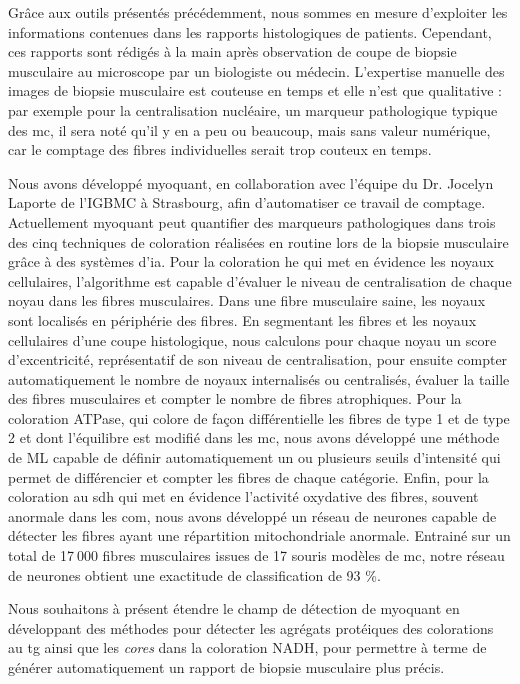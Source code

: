 Grâce aux outils présentés précédemment, nous sommes en mesure d’exploiter les informations contenues dans les rapports histologiques de patients. Cependant, ces rapports sont rédigés à la main après observation de coupe de biopsie musculaire au microscope par un biologiste ou médecin. L’expertise manuelle des images de biopsie musculaire est couteuse en temps et elle n’est que qualitative : par exemple pour la centralisation nucléaire, un marqueur pathologique typique des \gls{mc}, il sera noté qu’il y en a peu ou beaucoup, mais sans valeur numérique, car le comptage des fibres individuelles serait trop couteux en temps. 

Nous avons développé \gls{myoquant}, en collaboration avec l’équipe du Dr. Jocelyn Laporte de l’IGBMC à Strasbourg, afin d’automatiser ce travail de comptage. Actuellement \gls{myoquant} peut quantifier des marqueurs pathologiques dans trois des cinq techniques de coloration réalisées en routine lors de la biopsie musculaire grâce à des systèmes d’\gls{ia}. Pour la coloration \gls{he} qui met en évidence les noyaux cellulaires, l’algorithme est capable d’évaluer le niveau de centralisation de chaque noyau dans les fibres musculaires. Dans une fibre musculaire saine, les noyaux sont localisés en périphérie des fibres. En segmentant les fibres et les noyaux cellulaires d’une coupe histologique, nous calculons pour chaque noyau un score d’excentricité, représentatif de son niveau de centralisation, pour ensuite compter automatiquement le nombre de noyaux internalisés ou centralisés, évaluer la taille des fibres musculaires et compter le nombre de fibres atrophiques. Pour la coloration ATPase, qui colore de façon différentielle les fibres de type 1 et de type 2 et dont l'équilibre est modifié dans les \gls{mc}, nous avons développé une méthode de ML capable de définir automatiquement un ou plusieurs seuils d’intensité qui permet de différencier et compter les fibres de chaque catégorie. Enfin, pour la coloration au \gls{sdh} qui met en évidence l’activité oxydative des fibres, souvent anormale dans les \gls{com}, nous avons développé un réseau de neurones capable de détecter les fibres ayant une répartition mitochondriale anormale. Entrainé sur un total de 17 000 fibres musculaires issues de 17 souris modèles de \gls{mc}, notre réseau de neurones obtient une exactitude de classification de 93 \%.

Nous souhaitons à présent étendre le champ de détection de \gls{myoquant} en développant des méthodes pour détecter les agrégats protéiques des colorations au \gls{tg} ainsi que les \textit{cores} dans la coloration NADH, pour permettre à terme de générer automatiquement un rapport de biopsie musculaire plus précis. 

